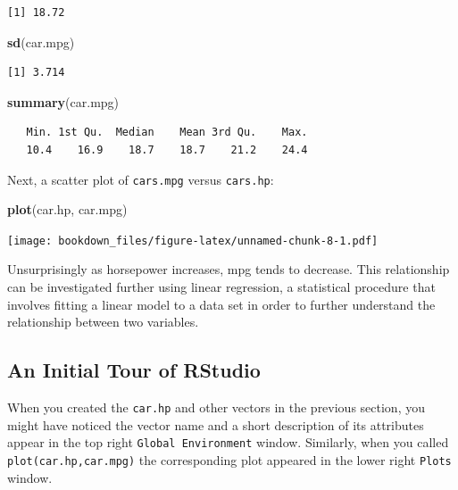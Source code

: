 \documentclass[
]{krantz}
\makeatletter
\newenvironment{Shaded}{\begin{snugshade}}{\end{snugshade}}
\newcommand{\KeywordTok}[1]{\textcolor[rgb]{0.27,0.27,0.27}{\textbf{#1}}}
\newcommand{\NormalTok}[1]{#1}
\newenvironment{kframe}{%
\medskip{}
\setlength{\fboxsep}{.8em}
 \def\at@end@of@kframe{}%
 \ifinner\ifhmode%
  \def\at@end@of@kframe{\end{minipage}}%
  \begin{minipage}{\columnwidth}%
 \fi\fi%
 \def\FrameCommand##1{\hskip\@totalleftmargin \hskip-\fboxsep
 \colorbox{shadecolor}{##1}\hskip-\fboxsep
     \hskip-\linewidth \hskip-\@totalleftmargin \hskip\columnwidth}%
 \MakeFramed {\advance\hsize-\width
   \@totalleftmargin\z@ \linewidth\hsize
   \@setminipage}}%
 {\par\unskip\endMakeFramed%
 \at@end@of@kframe}
\renewenvironment{Shaded}{\begin{kframe}}{\end{kframe}}
\makeatother
\begin{document}
\begin{verbatim}
[1] 18.72
\end{verbatim}

\begin{Shaded}
\begin{Highlighting}[]
\KeywordTok{sd}\NormalTok{(car.mpg)}
\end{Highlighting}
\end{Shaded}

\begin{verbatim}
[1] 3.714
\end{verbatim}

\begin{Shaded}
\begin{Highlighting}[]
\KeywordTok{summary}\NormalTok{(car.mpg)}
\end{Highlighting}
\end{Shaded}

\begin{verbatim}
   Min. 1st Qu.  Median    Mean 3rd Qu.    Max. 
   10.4    16.9    18.7    18.7    21.2    24.4 
\end{verbatim}

Next, a scatter plot of \texttt{cars.mpg} versus \texttt{cars.hp}:

\begin{Shaded}
\begin{Highlighting}[]
\KeywordTok{plot}\NormalTok{(car.hp, car.mpg)}
\end{Highlighting}
\end{Shaded}

\texttt{[image: bookdown\_files/figure-latex/unnamed-chunk-8-1.pdf]}

Unsurprisingly as horsepower increases, mpg tends to decrease. This relationship can be investigated further using linear regression, a statistical procedure that involves fitting a linear model to a data set in order to further understand the relationship between two variables.

\hypertarget{an-initial-tour-of-rstudio}{%
\subsection{An Initial Tour of RStudio}\label{an-initial-tour-of-rstudio}}

When you created the \texttt{car.hp} and other vectors in the previous section, you might have noticed the vector name and a short description of its attributes appear in the top right \texttt{Global\ Environment} window. Similarly, when you called \texttt{plot(car.hp,car.mpg)} the corresponding plot appeared in the lower right \texttt{Plots} window.
\end{document}
